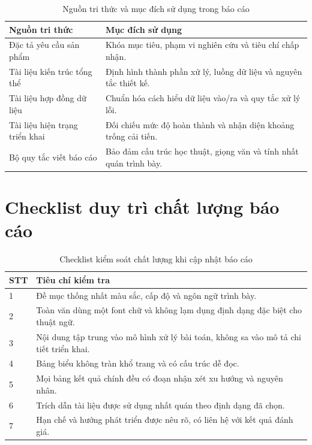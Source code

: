 \begin{table}[H]
\caption{Nguồn tri thức và mục đích sử dụng trong báo cáo}
\centering
\begin{tabularx}{\textwidth}{p{}X}
\toprule
\textbf{Nguồn tri thức} & \textbf{Mục đích sử dụng}\\
\midrule
Đặc tả yêu cầu sản phẩm & Khóa mục tiêu, phạm vi nghiên cứu và tiêu chí chấp nhận.\\
Tài liệu kiến trúc tổng thể & Định hình thành phần xử lý, luồng dữ liệu và nguyên tắc thiết kế.\\
Tài liệu hợp đồng dữ liệu & Chuẩn hóa cách hiểu dữ liệu vào/ra và quy tắc xử lý lỗi.\\
Tài liệu hiện trạng triển khai & Đối chiếu mức độ hoàn thành và nhận diện khoảng trống cải tiến.\\
Bộ quy tắc viết báo cáo & Bảo đảm cấu trúc học thuật, giọng văn và tính nhất quán trình bày.\\
\bottomrule
\end{tabularx}
\end{table}

\section{Checklist duy trì chất lượng báo cáo}

\begin{table}[H]
\caption{Checklist kiểm soát chất lượng khi cập nhật báo cáo}
\centering
\begin{tabularx}{\textwidth}{p{}X}
\toprule
\textbf{STT} & \textbf{Tiêu chí kiểm tra}\\
\midrule
1 & Đề mục thống nhất màu sắc, cấp độ và ngôn ngữ trình bày.\\
2 & Toàn văn dùng một font chữ và không lạm dụng định dạng đặc biệt cho thuật ngữ.\\
3 & Nội dung tập trung vào mô hình xử lý bài toán, không sa vào mô tả chi tiết triển khai.\\
4 & Bảng biểu không tràn khổ trang và có cấu trúc dễ đọc.\\
5 & Mọi bảng kết quả chính đều có đoạn nhận xét xu hướng và nguyên nhân.\\
6 & Trích dẫn tài liệu được sử dụng nhất quán theo định dạng đã chọn.\\
7 & Hạn chế và hướng phát triển được nêu rõ, có liên hệ với kết quả đánh giá.\\
\bottomrule
\end{tabularx}
\end{table}
